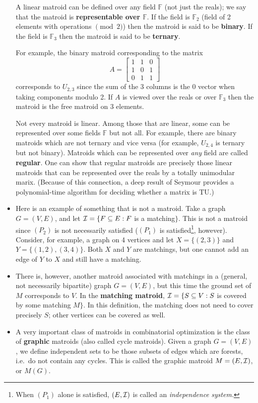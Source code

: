 \documentclass[12pt]{article}
\newcommand{\F}{{\mathbb F}}
\begin{document}
\begin{itemize}
A linear matroid can be defined over any field $\F$ (not just the
reals); we say that the matroid is {\bf representable over $\F$}. If
the field is $\F_2$ (field of 2 elements with operations $\pmod 2$)
then the matroid is said to be {\bf binary}. If the field is $\F_3$
then the matroid is said to be {\bf ternary}.

For example,
the binary matroid corresponding to the matrix $$A=\left[
\begin{array}{ccc}
1 & 1 & 0 \\
1 & 0 & 1 \\
0 & 1 & 1 
\end{array}\right]$$ corresponds to $U_{2,3}$ since the sum of the 3
columns is the 0 vector when taking components modulo 2. If $A$ is viewed
over the reals or over $\F_3$ then the matroid is the free matroid on 3
elements. 

Not every matroid is linear. Among those that are linear, some can be
represented over some fields $\F$ but not all. For example, there are
binary matroids which are not ternary and vice versa (for example,
$U_{2,4}$ is ternary but not binary). Matroids which
can be represented over {\it any} field are called {\bf regular}. One
can show that regular matroids are precisely those linear matroids that can
be represented over the reals by a totally unimodular marix. (Because
of this connection, a deep
result of Seymour provides a polynomial-time algorithm for deciding
whether a matrix is TU.)

\item Here is an example of something that is not a matroid. Take a
  graph $G=(V,E)$, and let ${\cal I}=\{F\subseteq E: F $ is a
  matching$\}$. This is not a matroid since $(P_2)$ is not necessarily
  satisfied ($(P_1)$ is satisfied\footnote{When $(P_1)$ alone is
    satisfied, $(E,{\cal I})$ is called an {\it independence system.}},
    however). Consider, for example, a graph on 4 vertices and let
    $X=\{(2,3)\}$ and $Y=\{(1,2),(3,4)\}$. Both $X$ and $Y$ are
    matchings, but one cannot add an edge of $Y$ to $X$ and still have
    a matching.
\item
There is, however, another matroid associated with matchings in a
(general, not necessarily bipartite) graph $G=(V,E)$, but this time
the ground set of $M$ corresponds to $V$. In the {\bf matching
matroid}, ${\cal I}=\{S \subseteq V: S$ is covered by some matching
$M\}$. In this definition, the matching does not need to cover
precisely $S$; other vertices can be covered as well.
\item
A very important class of matroids in combinatorial optimization is
the class of {\bf graphic} matroids (also called cycle
matroids). Given a graph $G=(V,E)$, we define independent sets to be
those subsets of edges which are forests, i.e.\ do not contain any
cycles. This is called the graphic matroid $M=(E,\cal I)$, or $M(G)$. 


\end{itemize}
\end{document}
